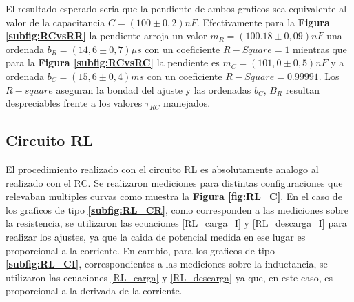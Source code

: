 \documentclass[11pt,a4paper]{article}
\begin{document}
El resultado esperado seria que la pendiente de ambos graficos sea equivalente al valor de la capacitancia $C = (100 \pm 0,2)nF$. Efectivamente para la \textbf{Figura \ref{subfig:RCvsRR}} la pendiente arroja un valor $m_{R} = (100.18 \pm 0,09)nF$ una ordenada $b_R = (14,6 \pm 0,7)\mu s$ con un coeficiente $R-Square = 1$ mientras que para la \textbf{Figura \ref{subfig:RCvsRC}} la pendiente es $m_{C} = (101,0 \pm 0,5)nF$ y a ordenada $b_C = (15,6 \pm 0,4)ms$ con un coeficiente $R-Square = 0.99991$. Los $R-square$ aseguran la bondad del ajuste y las ordenadas $b_C$, $B_R$ resultan despreciables frente a los valores $\tau_{RC}$ manejados. 


\subsection{Circuito RL}

El procedimiento realizado con el circuito RL es absolutamente analogo al realizado con el RC. Se realizaron mediciones para distintas configuraciones que relevaban multiples curvas como muestra la \textbf{Figura \ref{fig:RL_C}}. En el caso de los graficos de tipo \textbf{\ref{subfig:RL_CR}}, como corresponden a las mediciones sobre la resistencia, se utilizaron las ecuaciones \eqref{RL_carga_I} y \eqref{RL_descarga_I} para realizar los ajustes, ya que la caida de potencial medida en ese lugar es proporcional a la corriente. En cambio, para los graficos de tipo \textbf{\ref{subfig:RL_CI}}, correspondientes a las mediciones sobre la inductancia, se utilizaron las ecuaciones \eqref{RL_carga} y \eqref{RL_descarga} ya que, en este caso, es proporcional a la derivada de la corriente.
\end{document}

